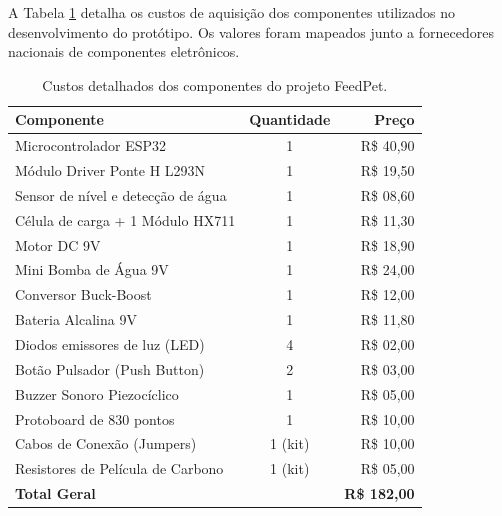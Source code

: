 \documentclass[12pt]{article}
\begin{document}
A Tabela \ref{tab:consumo_esp32} detalha os custos de aquisição dos componentes utilizados no desenvolvimento do protótipo. Os valores foram mapeados junto a fornecedores nacionais de componentes eletrônicos.

\begin{table}[ht]
    \centering
    \caption{Custos detalhados dos componentes do projeto FeedPet.}
    \label{tab:consumo_esp32}
    \vskip 0.1in 
    \begin{tabular}{|l|c|r|}
    \hline
    \textbf{Componente}                            & \textbf{Quantidade}       & \textbf{Preço}            \\ \hline
    Microcontrolador ESP32                         & 1                         & R\$ 40,90                 \\ \hline
    Módulo Driver Ponte H L293N                    & 1                         & R\$ 19,50                 \\ \hline
    Sensor de nível e detecção de água             & 1                         & R\$ 08,60                 \\ \hline
    Célula de carga + 1 Módulo HX711               & 1                         & R\$ 11,30                 \\ \hline
    Motor DC 9V                                    & 1                         & R\$ 18,90                 \\ \hline
    Mini Bomba de Água 9V                          & 1                         & R\$ 24,00                 \\ \hline
    Conversor Buck-Boost                           & 1                         & R\$ 12,00                 \\ \hline
    Bateria Alcalina 9V                            & 1                         & R\$ 11,80                 \\ \hline
    Diodos emissores de luz (LED)                  & 4                         & R\$ 02,00                 \\ \hline
    Botão Pulsador (Push Button)                   & 2                         & R\$ 03,00                 \\ \hline
    Buzzer Sonoro Piezocíclico                     & 1                         & R\$ 05,00                 \\ \hline
    Protoboard de 830 pontos                       & 1                         & R\$ 10,00                 \\ \hline
    Cabos de Conexão (Jumpers)                     & 1 (kit)                   & R\$ 10,00                 \\ \hline
    Resistores de Película de Carbono              & 1 (kit)                   & R\$ 05,00                 \\ \hline
    \multicolumn{2}{|l|}{\textbf{Total Geral}}                                 & \textbf{R\$ 182,00}       \\ \hline
    \end{tabular}
\end{table}
\end{document}
